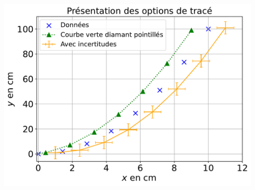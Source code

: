 \documentclass[a4paper, 12pt, garamond]{book}
\begin{document}
\begin{minipage}[t]{.48\linewidth}
  ~
  \begin{center}
    \includegraphics[width=\linewidth]{figures/python_plt-2}
    \label{fig:cplx}
  \end{center}
\end{minipage}
\end{document}

